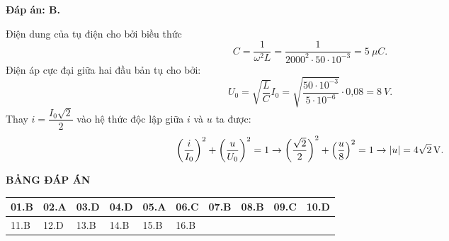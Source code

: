 \begin{enumerate}[label=\bfseries Câu \arabic*:]
	\loigiai
	{		\textbf{Đáp án: B.}
		
Điện dung của tụ điện cho bởi biều thức
$$
C=\dfrac{1}{\omega^{2} L}=\dfrac{1}{2000^{2} \cdot 50\cdot10^{-3}}= \SI{5}{\mu C}.
$$
Điện áp cực đại giữa hai đầu bản tụ cho bởi:
$$
U_{0}=\sqrt{\dfrac{L}{C}} I_{0}=\sqrt{\dfrac{50\cdot10^{-3}}{5\cdot10^{-6}}} \cdot \text{0,08}= \SI{8}{V}.
$$
Thay $i=\dfrac{I_{0} \sqrt{2}}{2}$ vào hệ thức độc lập giữa $i$ và $u$ ta được:
$$
\left(\dfrac{i}{I_{0}}\right)^{2}+\left(\dfrac{u}{U_{0}}\right)^{2}=1 \rightarrow\left(\dfrac{\sqrt{2}}{2}\right)^{2}+\left(\dfrac{u}{8}\right)^{2}=1 \rightarrow|u|= \xsi{4\sqrt{2}}{V}.
$$
		
	}
			
\end{enumerate}

\loigiai
{
	\begin{center}
		\textbf{BẢNG ĐÁP ÁN}
	\end{center}
	\begin{center}
		\begin{tabular}{|m{2.8em}|m{2.8em}|m{2.8em}|m{2.8em}|m{2.8em}|m{2.8em}|m{2.8em}|m{2.8em}|m{2.8em}|m{2.8em}|}
			\hline
			01.B  & 02.A  & 03.D  & 04.D  & 05.A  & 06.C  & 07.B & 08.B & 09.C & 10.D \\
			\hline
			11.B  & 12.D  & 13.B  & 14.B  & 15.B  & 16.B  &      &      &      &      \\
			\hline
			
		\end{tabular}
	\end{center}
}


